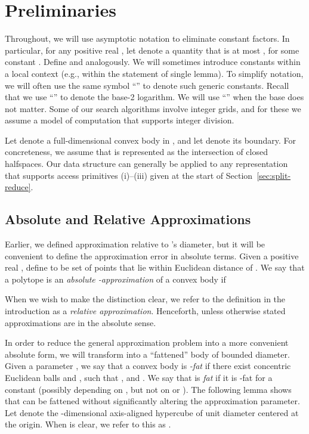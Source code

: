 \documentclass[11pt]{article}   \usepackage[letterpaper,hmargin=2.1cm,vmargin=3cm]{geometry}
\begin{document}
\section{Preliminaries} \label{sec:prelim}


Throughout, we will use asymptotic notation to eliminate constant factors. In particular, for any positive real , let  denote a quantity that is at most , for some constant . Define  and  analogously. We will sometimes introduce constants within a local context (e.g., within the statement of single lemma). To simplify notation, we will often use the same symbol ``'' to denote such generic constants. Recall that we use ``'' to denote the base-2 logarithm. We will use ``'' when the base does not matter. Some of our search algorithms involve integer grids, and for these we assume a model of computation that supports integer division. 

Let  denote a full-dimensional convex body in , and let  denote its boundary. For concreteness, we assume that  is represented as the intersection of  closed halfspaces. Our data structure can generally be applied to any representation that supports access primitives (i)--(iii) given at the start of Section~\ref{sec:split-reduce}.

\subsection{Absolute and Relative Approximations} \label{sec:prelim-abs}


Earlier, we defined approximation relative to 's diameter, but it will be convenient to define the approximation error in absolute terms. Given a positive real , define  to be set of points that lie within Euclidean distance  of . We say that a polytope  is an \emph{absolute -approximation} of a convex body  if 

When we wish to make the distinction clear, we refer to the definition in the introduction as a \emph{relative approximation}. Henceforth, unless otherwise stated approximations are in the absolute sense.

In order to reduce the general approximation problem into a more convenient absolute form, we will transform  into a ``fattened'' body of bounded diameter. Given a parameter , we say that a convex body  is \emph{-fat} if there exist concentric Euclidean balls  and , such that , and . We say that  is \emph{fat} if it is -fat for a constant  (possibly depending on , but not on  or ). The following lemma shows that  can be fattened without significantly altering the approximation parameter. Let  denote the -dimensional axis-aligned hypercube of unit diameter centered at the origin. When  is clear, we refer to this as .
\end{document}
